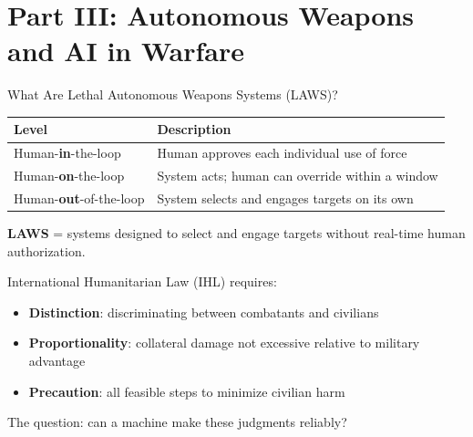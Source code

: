 \documentclass[aspectratio=169,11pt]{beamer}
\begin{document}
\section{Part III: Autonomous Weapons and AI in Warfare}

\begin{frame}[shrink=8]{What Are Lethal Autonomous Weapons Systems (LAWS)?}
\begin{conceptbox}
\small
\begin{tabular}{@{}p{3.8cm}p{7.2cm}@{}}
\toprule
\textbf{Level} & \textbf{Description} \\
\midrule
Human-\textbf{in}-the-loop & Human approves each individual use of force \\
Human-\textbf{on}-the-loop & System acts; human can override within a window \\
Human-\textbf{out}-of-the-loop & System selects and engages targets on its own \\
\bottomrule
\end{tabular}

\textbf{LAWS} = systems designed to select and engage targets without real-time human authorization.
\end{conceptbox}

International Humanitarian Law (IHL) requires:
\begin{itemize}
    \item \textbf{Distinction}: discriminating between combatants and civilians
    \item \textbf{Proportionality}: collateral damage not excessive relative to military advantage
    \item \textbf{Precaution}: all feasible steps to minimize civilian harm
\end{itemize}

The question: can a machine make these judgments reliably? \parencite{scharre_army_of_none_2018}
\end{frame}
\end{document}

